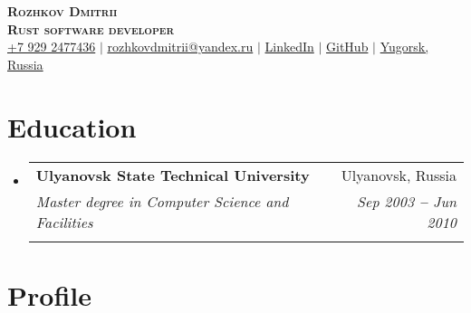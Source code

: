 \documentclass[letterpaper,11pt]{article}
\makeatletter
\newcommand{\resumeItem}[1]{
  \item\small{
    {#1 \vspace{-2pt}}
  }
}
\newcommand{\resumeEducationHeading}[6]{
  \vspace{-2pt}\item
    \begin{tabular*}{0.97\textwidth}[t]{l@{\extracolsep{\fill}}r}
      \textbf{#1} & #2 \\
      \textit{\small#3} & \textit{\small #4} \\
      \textit{\small#5} & \textit{\small #6} \\
    \end{tabular*}\vspace{-5pt}
}
\newcommand{\resumeSubHeadingListStart}{\begin{itemize}[leftmargin=0.15in, label={}]}
\newcommand{\resumeSubHeadingListEnd}{\end{itemize}}
\newcommand{\resumeItemListStart}{\begin{itemize}}
\newcommand{\resumeItemListEnd}{\end{itemize}\vspace{-5pt}}
\makeatother
\begin{document}

\begin{center}
    \textbf{\Huge \scshape Rozhkov Dmitrii} \\ \vspace{3pt}
    \textbf{\large \scshape Rust software developer} \\ \vspace{3pt}
    \small
    \faMobile \hspace{.5pt} \href{tel:79292477436}{+7 929 2477436}
    $|$
    \faAt \hspace{.5pt} \href{mailto:rozhkovdmitrii@yandex.ru}{rozhkovdmitrii@yandex.ru}
    $|$
    \faLinkedinSquare \hspace{.5pt} \href{https://www.linkedin.com/in/dmitrii-rozhkov-596041107/}{LinkedIn}
    $|$
    \faGithub \hspace{.5pt} \href{https://github.com/rozhkovdmitrii}{GitHub}
    $|$
    \faMapMarker \hspace{.5pt} \href{https://goo.gl/maps/CAPxEvSmreu9ZjjHA}{Yugorsk, Russia}
\end{center}




\section{Education}
  \vspace{3pt}
  \resumeSubHeadingListStart
    
    \resumeEducationHeading
      {Ulyanovsk State Technical University
      }{Ulyanovsk, Russia}
      {Master degree in Computer Science and Facilities }{Sep 2003 \textbf{--} Jun 2010}
      {}{}
    
    
  \resumeSubHeadingListEnd



  
\section{Profile}
\vspace{3pt}
\justifying
\setlength{\parindent}{10pt}
\end{document}
